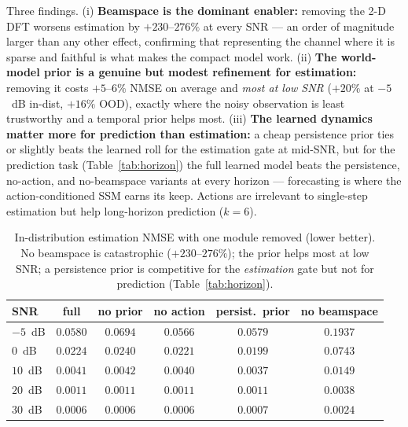 \documentclass[11pt]{article}
\begin{document}
Three findings. (i) \textbf{Beamspace is the dominant enabler:} removing the 2-D DFT worsens
estimation by $+230$--$276\%$ at every SNR --- an order of magnitude larger than any other effect,
confirming that representing the channel where it is sparse and faithful is what makes the compact
model work. (ii) \textbf{The world-model prior is a genuine but modest refinement for estimation:}
removing it costs $+5$--$6\%$ NMSE on average and \emph{most at low SNR} ($+20\%$ at $-5$~dB in-dist,
$+16\%$ OOD), exactly where the noisy observation is least trustworthy and a temporal prior helps most.
(iii) \textbf{The learned dynamics matter more for prediction than estimation:} a cheap persistence
prior ties or slightly beats the learned roll for the estimation gate at mid-SNR, but for the
prediction task (Table~\ref{tab:horizon}) the full learned model beats the persistence, no-action, and
no-beamspace variants at every horizon --- forecasting is where the action-conditioned SSM earns its
keep. Actions are irrelevant to single-step estimation but help long-horizon prediction ($k{=}6$).

\begin{table}[h]
\centering
\begin{tabular}{lccccc}
\toprule
SNR & \textbf{full} & no prior & no action & persist.\ prior & no beamspace \\
\midrule
$-5$~dB & $\mathbf{0.0580}$ & $0.0694$ & $0.0566$ & $0.0579$ & $0.1937$ \\
$0$~dB  & $0.0224$ & $0.0240$ & $0.0221$ & $\mathbf{0.0199}$ & $0.0743$ \\
$10$~dB & $0.0041$ & $0.0042$ & $0.0040$ & $\mathbf{0.0037}$ & $0.0149$ \\
$20$~dB & $0.0011$ & $0.0011$ & $0.0011$ & $0.0011$ & $0.0038$ \\
$30$~dB & $\mathbf{0.0006}$ & $0.0006$ & $0.0006$ & $0.0007$ & $0.0024$ \\
\bottomrule
\end{tabular}
\caption{In-distribution estimation NMSE with one module removed (lower better). No beamspace is
catastrophic ($+230$--$276\%$); the prior helps most at low SNR; a persistence prior is competitive
for the \emph{estimation} gate but not for prediction (Table~\ref{tab:horizon}).}
\label{tab:ablation}
\end{table}
\end{document}
